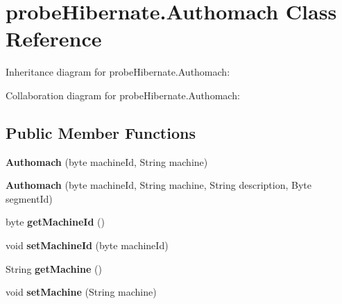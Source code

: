 \hypertarget{classprobe_hibernate_1_1_authomach}{}\section{probe\+Hibernate.\+Authomach Class Reference}
\label{classprobe_hibernate_1_1_authomach}


Inheritance diagram for probe\+Hibernate.\+Authomach\+:


Collaboration diagram for probe\+Hibernate.\+Authomach\+:
\subsection*{Public Member Functions}
\begin{DoxyCompactItemize}
\item 
\mbox{\label{classprobe_hibernate_1_1_authomach_a50bb8f6ed2cbd696f2ca9c77f37c8707}} 
{\bfseries Authomach} (byte machine\+Id, String machine)
\item 
\mbox{\label{classprobe_hibernate_1_1_authomach_a532e4886ba58c65784e9dfc500c5c049}} 
{\bfseries Authomach} (byte machine\+Id, String machine, String description, Byte segment\+Id)
\item 
\mbox{\label{classprobe_hibernate_1_1_authomach_a6622b1cc19c725e3dcfc4e4c99e0c2f1}} 
byte {\bfseries get\+Machine\+Id} ()
\item 
\mbox{\label{classprobe_hibernate_1_1_authomach_a71a929aac648b800cfa8ca9352b9af81}} 
void {\bfseries set\+Machine\+Id} (byte machine\+Id)
\item 
\mbox{\label{classprobe_hibernate_1_1_authomach_a805733d7ef1801fab46c5d0270d8b77f}} 
String {\bfseries get\+Machine} ()
\item 
\mbox{\label{classprobe_hibernate_1_1_authomach_a7290af3106aa0ceb2435c325abeb91ea}} 
void {\bfseries set\+Machine} (String machine)
\item 
\mbox{\label{classprobe_hibernate_1_1_authomach_a10300c36f2f6d2557bcdbe096ff784b9}} 

\end{DoxyCompactItemize}
